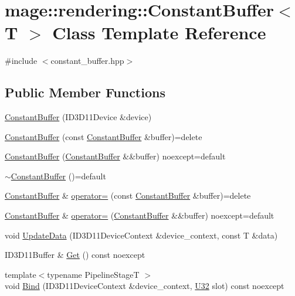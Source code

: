 \hypertarget{classmage_1_1rendering_1_1_constant_buffer}{}\section{mage\+:\+:rendering\+:\+:Constant\+Buffer$<$ T $>$ Class Template Reference}
\label{classmage_1_1rendering_1_1_constant_buffer}


{\ttfamily \#include $<$constant\+\_\+buffer.\+hpp$>$}

\subsection*{Public Member Functions}
\begin{DoxyCompactItemize}
\item 
\mbox{\hyperlink{classmage_1_1rendering_1_1_constant_buffer_af282b97fba72826646c1bc31d8953b9e}{Constant\+Buffer}} (I\+D3\+D11\+Device \&device)
\item 
\mbox{\hyperlink{classmage_1_1rendering_1_1_constant_buffer_aacc1ace626cdf1fbeb2d51d7789495da}{Constant\+Buffer}} (const \mbox{\hyperlink{classmage_1_1rendering_1_1_constant_buffer}{Constant\+Buffer}} \&buffer)=delete
\item 
\mbox{\hyperlink{classmage_1_1rendering_1_1_constant_buffer_a1c1c73d617245d7dead836b0d3a00a6f}{Constant\+Buffer}} (\mbox{\hyperlink{classmage_1_1rendering_1_1_constant_buffer}{Constant\+Buffer}} \&\&buffer) noexcept=default
\item 
\mbox{\hyperlink{classmage_1_1rendering_1_1_constant_buffer_af75271b7a5550583732e0575b576f088}{$\sim$\+Constant\+Buffer}} ()=default
\item 
\mbox{\hyperlink{classmage_1_1rendering_1_1_constant_buffer}{Constant\+Buffer}} \& \mbox{\hyperlink{classmage_1_1rendering_1_1_constant_buffer_ac8770d151c9c8bdb27babdb060fd7f4c}{operator=}} (const \mbox{\hyperlink{classmage_1_1rendering_1_1_constant_buffer}{Constant\+Buffer}} \&buffer)=delete
\item 
\mbox{\hyperlink{classmage_1_1rendering_1_1_constant_buffer}{Constant\+Buffer}} \& \mbox{\hyperlink{classmage_1_1rendering_1_1_constant_buffer_adbd72a5aa7eab5461eed06c611dd908c}{operator=}} (\mbox{\hyperlink{classmage_1_1rendering_1_1_constant_buffer}{Constant\+Buffer}} \&\&buffer) noexcept=default
\item 
void \mbox{\hyperlink{classmage_1_1rendering_1_1_constant_buffer_a4289215f38cf17e767e438021894a140}{Update\+Data}} (I\+D3\+D11\+Device\+Context \&device\+\_\+context, const T \&data)
\item 
I\+D3\+D11\+Buffer \& \mbox{\hyperlink{classmage_1_1rendering_1_1_constant_buffer_a0020fcf17b61d277430c572df44992b5}{Get}} () const noexcept
\item 
{\footnotesize template$<$typename Pipeline\+StageT $>$ }\\void \mbox{\hyperlink{classmage_1_1rendering_1_1_constant_buffer_a49c3982ed5b6a01ddc8cadd509eff7f8}{Bind}} (I\+D3\+D11\+Device\+Context \&device\+\_\+context, \mbox{\hyperlink{namespacemage_aa5d6eaabaac3cdd01873d6a3d27e90f3}{U32}} slot) const noexcept
\end{DoxyCompactItemize}
